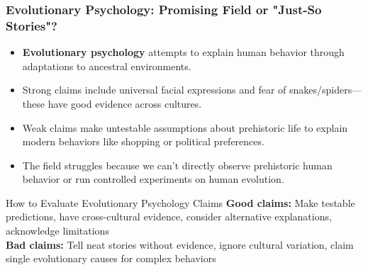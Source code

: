 \documentclass{beamer}
\begin{document}
	\begin{frame}
		\frametitle{Evolutionary Psychology: Promising Field or "Just-So Stories"?}
		\begin{itemize}
			\item \textbf{Evolutionary psychology} attempts to explain human behavior through adaptations to ancestral environments.
			\item Strong claims include universal facial expressions and fear of snakes/spiders—these have good evidence across cultures.
			\item Weak claims make untestable assumptions about prehistoric life to explain modern behaviors like shopping or political preferences.
			\item The field struggles because we can't directly observe prehistoric human behavior or run controlled experiments on human evolution.
		\end{itemize}
		\begin{block}{How to Evaluate Evolutionary Psychology Claims}
			\textbf{Good claims:} Make testable predictions, have cross-cultural evidence, consider alternative explanations, acknowledge limitations\\
			\textbf{Bad claims:} Tell neat stories without evidence, ignore cultural variation, claim single evolutionary causes for complex behaviors
		\end{block}
	\end{frame}
	
\end{document}
